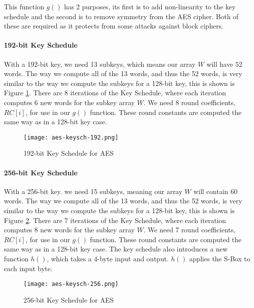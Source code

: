 This function $g()$ has 2 purposes, its first is to add non-linearity to the key schedule and the second is to remove symmetry from the AES cipher. Both of these are required as it protects from some attacks against block ciphers.  

\paragraph{192-bit Key Schedule}

With a 192-bit key, we need 13 subkeys, which means our array $W$ will have $52$ words. The way we compute all of the 13 words, and thus the 52 words, is very similar to the way we compute the subkeys for a 128-bit key, this is shown is Figure \ref{AES-KeySch-192}. There are 8 iterations of the Key Schedule, where each iteration computes 6 new words for the subkey array $W$. We need 8 round coefficients, $RC[i]$, for use in our $g()$ function. These round constants are computed the same way as in a 128-bit key case.

\begin{figure}[h!]
\begin{center}
\texttt{[image: aes-keysch-192.png]}
\end{center}
\caption{192-bit Key Schedule for AES}
\label{AES-KeySch-192}
\end{figure}

\paragraph{256-bit Key Schedule}

With a 256-bit key. we need 15 subkeys, meaning our array $W$ will contain 60 words. The way we compute all of the 13 words, and thus the 52 words, is very similar to the way we compute the subkeys for a 128-bit key, this is shown is Figure \ref{AES-KeySch-256}. There are 7 iterations of the Key Schedule, where each iteration computes 8 new words for the subkey array $W$. We need 7 round coefficients, $RC[i]$, for use in our $g()$ function. These round constants are computed the same way as in a 128-bit key case. The key schedule also introduces a new function $h()$, which takes a 4-byte input and output. $h()$ applies the S-Box to each input byte. 

\begin{figure}[h!]
\begin{center}
\texttt{[image: aes-keysch-256.png]}
\end{center}
\caption{256-bit Key Schedule for AES}
\label{AES-KeySch-256}
\end{figure}

